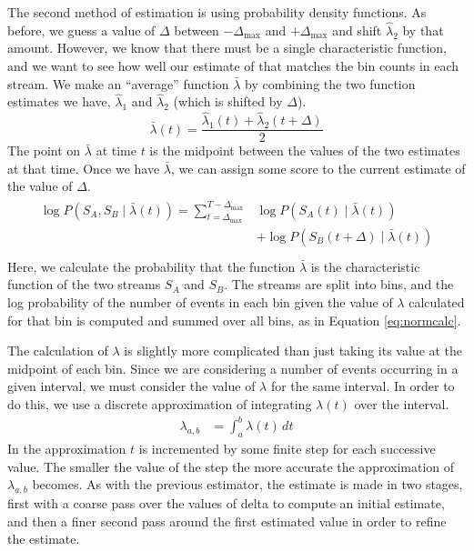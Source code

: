 \documentclass[a4paper,11pt]{article}
\begin{document}
   The second method of estimation is using probability density functions. As
   before, we guess a value of $\Delta$ between $-\Delta_{\text{max}}$ and
   $+\Delta_{\text{max}}$ and shift $\hat{\lambda}_2$ by that amount. However,
   we know that there must be a single characteristic function, and we want to
   see how well our estimate of that matches the bin counts in each stream. We
   make an ``average'' function $\bar{\lambda}$ by combining the two function
   estimates we have, $\hat{\lambda}_1$ and $\hat{\lambda}_2$ (which is shifted
   by $\Delta$).
   \begin{equation}
   \bar{\lambda}(t)=\frac{\hat{\lambda}_1(t)+\hat{\lambda}_2(t+\Delta)}{2}
   \end{equation}
   The point on $\bar{\lambda}$ at time $t$ is the midpoint between the values of
   the two estimates at that time. Once we have $\bar{\lambda}$, we can assign some
   score to the current estimate of the value of $\Delta$.
   \begin{align}
   \begin{split}
   \log P(S_A,S_B\mid\bar{\lambda}(t))=\sum_{t=\Delta_{\text{max}}}^{T-\Delta_{\text{max}}}&\log P(S_A(t)\mid \bar{\lambda}(t))\\
   &+ \log P(S_B(t+\Delta)\mid \bar{\lambda}(t))\\
   \end{split}
   \end{align}
   Here, we calculate the probability that the function $\bar{\lambda}$ is the
   characteristic function of the two streams $S_A$ and $S_B$. The streams are
   split into bins, and the log probability of the number of events in each bin
   given the value of $\lambda$ calculated for that bin is computed and summed
   over all bins, as in Equation \eqref{eq:normcalc}.

   The calculation of $\lambda$ is slightly more complicated than just taking
   its value at the midpoint of each bin. Since we are considering a number of
   events occurring in a given interval, we must consider the value of $\lambda$
   for the same interval. In order to do this, we use a discrete approximation
   of integrating $\lambda(t)$ over the interval.
   \begin{align}
   \lambda_{a,b}&=\int_a^b\lambda(t)\,dt
   \end{align}
   In the approximation $t$ is incremented by some finite step for each
   successive value. The smaller the value of the step the more accurate the
   approximation of $\lambda_{a,b}$ becomes. As with the previous estimator, the
   estimate is made in two stages, first with a coarse pass over the values of
   delta to compute an initial estimate, and then a finer second pass around the
   first estimated value in order to refine the estimate. 
\end{document}

